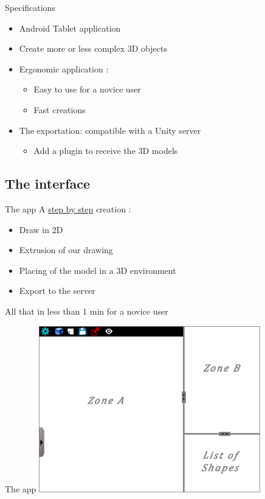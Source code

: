 \documentclass[a4paper,10pt]{beamer}
\begin{document}
		\begin{frame}{Specifications}
			\begin{itemize}
				\item Android Tablet application
				\item Create more or less complex 3D objects
				\item Ergonomic application :
				\begin{itemize}
					\item Easy to use for a novice user
					\item Fast creations
				\end{itemize}
				\item The exportation: compatible with a Unity server
				\begin{itemize}
					\item Add a plugin to receive the 3D models
				\end{itemize}
			\end{itemize}
			
		\end{frame}
		
		\subsection{The interface}
		
		
			\begin{frame}{The app}
				A \underline{step by step} creation :
				\begin{itemize}
					\item Draw in 2D
					\item Extrusion of our drawing
					\item Placing of the model in a 3D environment
					\item Export to the server
				\end{itemize}
				All that in less than 1 min for a novice user
			\end{frame}
		
		
			\begin{frame}{The app}
				\includegraphics[height=205pt]{maquette/maquette_1.png}
			\end{frame}
			
\end{document}
